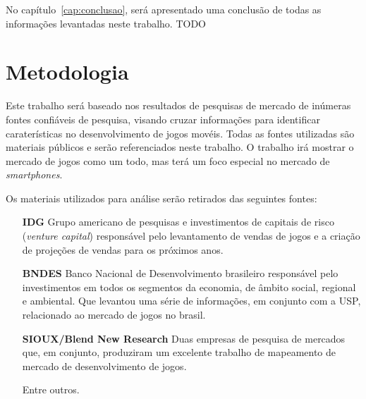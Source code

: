 No capítulo~\ref{cap:conclusao}, será apresentado uma conclusão de todas as informações levantadas neste trabalho. TODO



\section{Metodologia}

Este trabalho será baseado nos resultados de pesquisas de mercado de inúmeras fontes confiáveis de pesquisa, visando cruzar informações para identificar caraterísticas no desenvolvimento de jogos movéis. Todas as fontes utilizadas são materiais públicos e serão referenciados neste trabalho.\newline
O trabalho irá mostrar o mercado de jogos como um todo, mas terá um foco especial no mercado de \emph{smartphones}.




Os materiais utilizados para análise serão retirados das seguintes fontes:

\begin{itemize}

	\item [\textbf{IDG}] Grupo americano de pesquisas e investimentos de capitais de risco (\emph{venture capital}) responsável pelo levantamento de vendas de jogos e a criação de projeções de vendas para os próximos anos.

	\item [\textbf{BNDES}] Banco Nacional de Desenvolvimento brasileiro responsável pelo investimentos em todos os segmentos da economia, de âmbito social, regional e ambiental. Que levantou uma série de informações, em conjunto com a USP, relacionado ao mercado de jogos no brasil.
	
	\item[\textbf{SIOUX/Blend New Research}] Duas empresas de pesquisa de mercados que, em conjunto, produziram um excelente trabalho de mapeamento de mercado de desenvolvimento de jogos.
	
	\item [Entre outros.]

\end{itemize}





